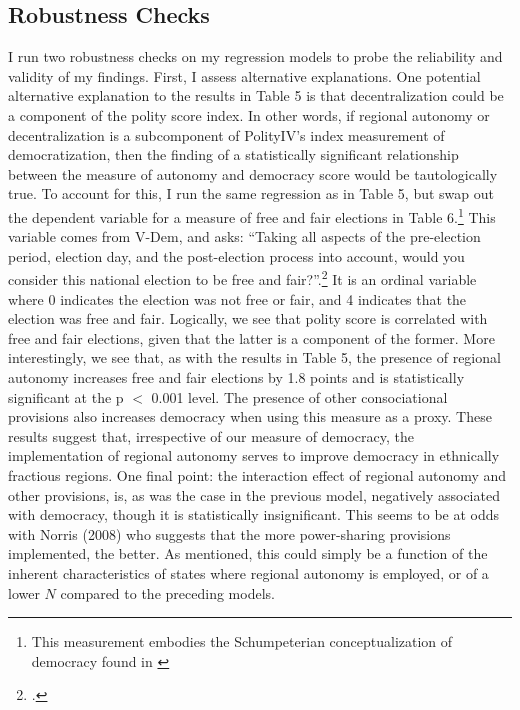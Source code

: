 \documentclass[12pt]{article}
\begin{document}
\subsection{Robustness Checks}
I run two robustness checks on my regression models to probe the reliability and validity of my findings. First, I assess alternative explanations. One potential alternative explanation to the results in Table 5 is that decentralization could be a component of the polity score index. In other words, if regional autonomy or decentralization is a subcomponent of PolityIV's index measurement of democratization, then the finding of a statistically significant relationship between the measure of autonomy and democracy score would be tautologically true. To account for this, I run the same regression as in Table 5, but swap out the dependent variable for a measure of free and fair elections in Table 6.\footnote{This measurement embodies the Schumpeterian conceptualization of democracy found in \cite{schumpeter_capitalism_1950}} This variable comes from V-Dem, and asks: ``Taking all aspects of the pre-election period, election day, and the post-election process into account, would you consider this national election to be free and fair?''.\footcite{coppedge_v-dem_nodate} It is an ordinal variable where 0 indicates the election was not free or fair, and 4 indicates that the election was free and fair. Logically, we see that polity score is correlated with free and fair elections, given that the latter is a component of the former. More interestingly, we see that, as with the results in Table 5, the presence of regional autonomy increases free and fair elections by 1.8 points and is statistically significant at the p $<$ 0.001 level. The presence of other consociational provisions also increases democracy when using this measure as a proxy. These results suggest that, irrespective of our measure of democracy, the implementation of regional autonomy serves to improve democracy in ethnically fractious regions. One final point: the interaction effect of regional autonomy and other provisions, is, as was the case in the previous model, negatively associated with democracy, though it is statistically insignificant. This seems to be at odds with Norris (2008) who suggests that the more power-sharing provisions implemented, the better. As mentioned, this could simply be a function of the inherent characteristics of states where regional autonomy is employed, or of a lower $N$ compared to the preceding models.  
\end{document}

